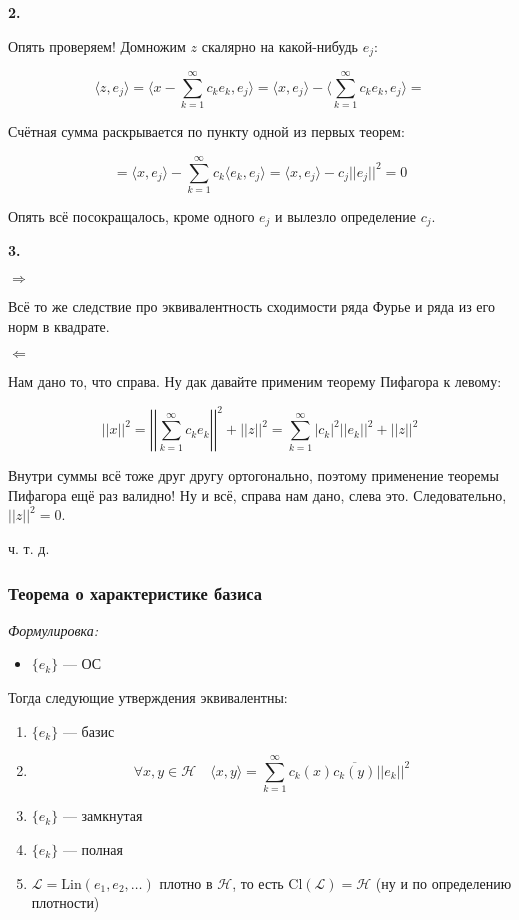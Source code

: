 \documentclass{article}
\def\sk#1#2{\langle #1, #2 \rangle}
\begin{document}
\textbf{2.}

Опять проверяем! Домножим $z$ скалярно на какой-нибудь $e_j$:

\[\sk{z}{e_j} = \sk{x - \sum_{k = 1}^{\infty} c_k e_k}{e_j} = \sk{x}{e_j} - \sk{\sum_{k = 1}^{\infty} c_k e_k}{e_j} =\]

Счётная сумма раскрывается по пункту одной из первых теорем:

\[= \sk{x}{e_j} - \sum_{k = 1}^{\infty} c_k \sk{e_k}{e_j} = \sk{x}{e_j} - c_j ||e_j||^2 = 0\]

Опять всё посокращалось, кроме одного $e_j$ и вылезло определение $c_j$.

\textbf{3. }

$\Rightarrow$

Всё то же следствие про эквивалентность сходимости ряда Фурье и ряда из его норм в квадрате.

$\Leftarrow$

Нам дано то, что справа. Ну дак давайте применим теорему Пифагора к левому:

\[||x||^2 = \left|\left| \sum_{k = 1}^{\infty} c_k e_k\right|\right|^2 + ||z||^2 = \sum_{k = 1}^{\infty} |c_k|^2||e_k||^2 + ||z||^2\]

Внутри суммы всё тоже друг другу ортогонально, поэтому применение теоремы Пифагора ещё раз валидно! Ну и всё, справа нам дано, слева это. Следовательно, $||z||^2 = 0$.

ч. т. д. 

\subsubsection{Теорема о характеристике базиса}
\textit{Формулировка:}

\begin{itemize}
    \item $\{e_k\}$ --- ОС
\end{itemize}

Тогда следующие утверждения эквивалентны:

\begin{enumerate}
    \item $\{e_k\}$ --- базис
    \item \[\forall x, y \in \mathcal{H} \quad \sk{x}{y} = \sum_{k = 1}^{\infty} c_k(x) \overline{c_k(y)} ||e_k||^2\]
    \item $\{e_k\}$ --- замкнутая
    \item $\{e_k\}$ --- полная
    \item $\mathcal{L} = \text{Lin}(e_1, e_2, \ldots)$ плотно в $\mathcal{H}$, то есть Cl$(\mathcal{L}) = \mathcal{H}$ (ну и по определению плотности)
\end{enumerate}
\end{document}
